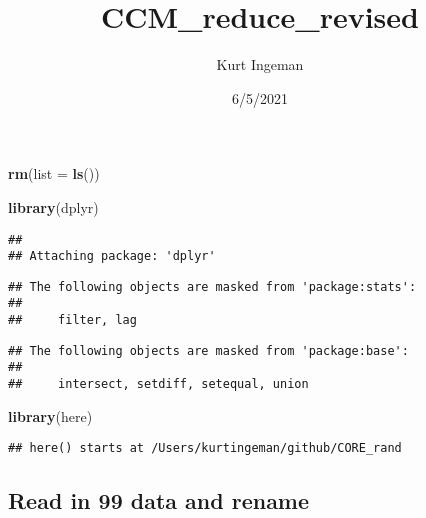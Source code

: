 \documentclass[]{article}
\title{CCM\_reduce\_revised}
\author{Kurt Ingeman}
\date{6/5/2021}
\newenvironment{Shaded}{\begin{snugshade}}{\end{snugshade}}
\newcommand{\KeywordTok}[1]{\textcolor[rgb]{0.13,0.29,0.53}{\textbf{{#1}}}}
\newcommand{\DataTypeTok}[1]{\textcolor[rgb]{0.13,0.29,0.53}{{#1}}}
\newcommand{\NormalTok}[1]{{#1}}
\begin{document}
\maketitle

\begin{Shaded}
\begin{Highlighting}[]
\KeywordTok{rm}\NormalTok{(}\DataTypeTok{list =} \KeywordTok{ls}\NormalTok{())}

\KeywordTok{library}\NormalTok{(dplyr)}
\end{Highlighting}
\end{Shaded}

\begin{verbatim}
## 
## Attaching package: 'dplyr'
\end{verbatim}

\begin{verbatim}
## The following objects are masked from 'package:stats':
## 
##     filter, lag
\end{verbatim}

\begin{verbatim}
## The following objects are masked from 'package:base':
## 
##     intersect, setdiff, setequal, union
\end{verbatim}

\begin{Shaded}
\begin{Highlighting}[]
\KeywordTok{library}\NormalTok{(here)}
\end{Highlighting}
\end{Shaded}

\begin{verbatim}
## here() starts at /Users/kurtingeman/github/CORE_rand
\end{verbatim}

\subsection{Read in 99 data and
rename}\label{read-in-99-data-and-rename}
\end{document}
